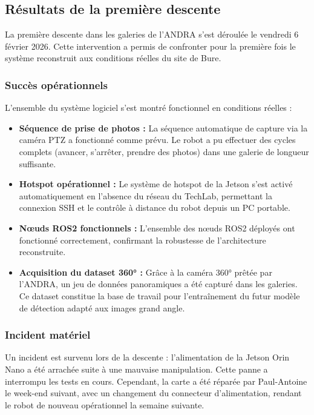 \documentclass[12pt,a4paper]{article}
\begin{document}
\subsection{Résultats de la première descente}

La première descente dans les galeries de l'ANDRA s'est déroulée le vendredi 6 février 2026. Cette intervention a permis de confronter pour la première fois le système reconstruit aux conditions réelles du site de Bure.

\subsubsection{Succès opérationnels}

L'ensemble du système logiciel s'est montré fonctionnel en conditions réelles :

\begin{itemize}
    \item \textbf{Séquence de prise de photos :} La séquence automatique de capture via la caméra PTZ a fonctionné comme prévu. Le robot a pu effectuer des cycles complets (avancer, s'arrêter, prendre des photos) dans une galerie de longueur suffisante.
    \item \textbf{Hotspot opérationnel :} Le système de hotspot de la Jetson s'est activé automatiquement en l'absence du réseau du TechLab, permettant la connexion SSH et le contrôle à distance du robot depuis un PC portable.
    \item \textbf{Nœuds ROS2 fonctionnels :} L'ensemble des nœuds ROS2 déployés ont fonctionné correctement, confirmant la robustesse de l'architecture reconstruite.
    \item \textbf{Acquisition du dataset 360° :} Grâce à la caméra 360° prêtée par l'ANDRA, un jeu de données panoramiques a été capturé dans les galeries. Ce dataset constitue la base de travail pour l'entraînement du futur modèle de détection adapté aux images grand angle.
\end{itemize}

\subsubsection{Incident matériel}

Un incident est survenu lors de la descente : l'alimentation de la Jetson Orin Nano a été arrachée suite à une mauvaise manipulation. Cette panne a interrompu les tests en cours. Cependant, la carte a été réparée par Paul-Antoine le week-end suivant, avec un changement du connecteur d'alimentation, rendant le robot de nouveau opérationnel la semaine suivante.
\end{document}
